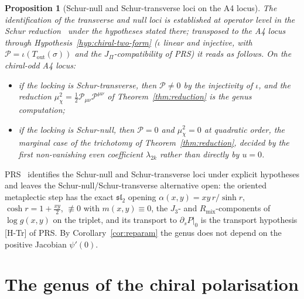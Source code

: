 \documentclass[11pt]{article}
\newtheorem{proposition}{Proposition}
\theoremstyle{definition}
\theoremstyle{remark}
\newcommand{\JPi}{J_{\Pi}}
\newcommand{\Pchi}{\mathcal{P}}
\newcommand{\muchi}{\mu_{\chi}^{2}}
\begin{document}
    \begin{proposition}[Schur-null and Schur-transverse loci on the A4 locus]
      \label{prop:dichotomy}
      The identification of the transverse and null loci is established at operator level in the Schur
      reduction~\cite{Beau2026prs}
      under the hypotheses stated there; transposed to the A4 locus through Hypothesis~\ref{hyp:chiral-two-form}
      ($\iota$ linear and injective, with $\Pchi=\iota(T_{\mathrm{out}}(\sigma))$ and the $\JPi$-compatibility of PRS)
      it reads as follows.
      On the chiral-odd A4 locus:
      \begin{itemize}
        \item if the locking is Schur-transverse, then $\Pchi\neq0$ by the injectivity of $\iota$, and the reduction
        $\muchi = \tfrac12 \Pchi_{\mu\nu} \Pchi^{\mu\nu}$ of Theorem~\ref{thm:reduction} is the genus computation;
        \item if the locking is Schur-null, then $\Pchi = 0$ and $\muchi = 0$ at quadratic order, the marginal case
        of the trichotomy of Theorem~\ref{thm:reduction}, decided by the first non-vanishing even coefficient
        $\lambda_{2k}$ rather than directly by $u = 0$.
      \end{itemize}
    \end{proposition}

    PRS~\cite{Beau2026prs} identifies the Schur-null and Schur-transverse loci under explicit hypotheses and leaves
    the Schur-null/Schur-transverse alternative open: the oriented metaplectic step has the exact $\mathfrak{sl}_2$ opening
    $\alpha(x,y)=xy\,r/\sinh r$, $\cosh r=1+\tfrac{xy}{2}$, $\not\equiv0$ with $m(x,y)\equiv0$, the $J_3$- and $R_{\mathrm{mix}}$-components of $\log g(x,y)$ on the triplet, and its transport to $\partial_s P|_{0}$ is the
    transport hypothesis [H-Tr] of PRS.
    By Corollary~\ref{cor:reparam} the genus does not depend on the positive Jacobian $\psi'(0)$.

  \section{The genus of the chiral polarisation}
    \label{sec:genus}
\end{document}
